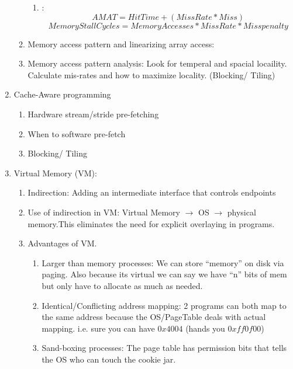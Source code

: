 \documentclass[12pt]{article}
\renewcommand{\=}[1]{\stackrel{#1}{=}} %
\theoremstyle{definition}
\theoremstyle{remark}
\begin{document}
\begin{center}
\begin{enumerate}
\begin{enumerate}
      \begin{enumerate}
      \item :
        \begin{equation}
          \label{eq: AMAT}
         AMAT = HitTime + (MissRate * Miss) 
        \end{equation}
        \begin{equation}
          MemoryStallCycles = MemoryAccesses * MissRate * Miss penalty
        \end{equation}
      \end{enumerate}
    \item Memory access pattern and linearizing array access: 
    \item Memory access pattern analysis: Look for temperal and
      spacial locaility. Calculate mis-rates and how to maximize
      locality. (Blocking/ Tiling)
    \end{enumerate}
  \item Cache-Aware programming
    \begin{enumerate}
    \item Hardware stream/stride pre-fetching
    \item When to software pre-fetch
    \item Blocking/ Tiling
    \end{enumerate}
  \item Virtual Memory (VM):
    \begin{enumerate}
    \item Indirection: Adding an intermediate interface that controls endpoints
    \item Use of indirection in VM: Virtual Memory $\rightarrow$ OS
      $\rightarrow$ physical memory.This eliminates the need for
      explicit overlaying in programs.
    \item Advantages of VM.
      \begin{enumerate}
      \item Larger than memory processes: We can store ``memory'' on
        disk via paging. Also because its virtual we can say we have
        ``n'' bits of mem but only have to allocate as much as needed.
      \item Identical/Conflicting address mapping: 2 programs can both
        map to the same address because the OS/PageTable deals with
        actual mapping. i.e. sure you can have $0x4004$ (hands you $0xff0f00$)
      \item Sand-boxing processes: The page table has permission bits
        that tells the OS who can touch the cookie jar.

\end{enumerate}
\end{enumerate}
\end{enumerate}
\end{center}
\end{document}
